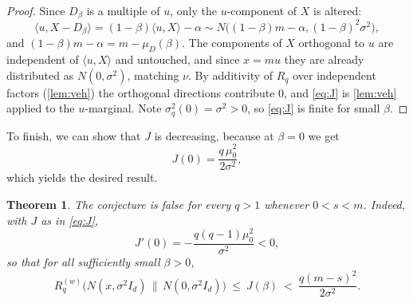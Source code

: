 \documentclass[10pt,a4paper]{amsart}
\newtheorem{theorem}{Theorem}
\numberwithin{equation}{section}
\begin{document}
\begin{proof}
Since $D_\beta$ is a multiple of $u$, only the $u$-component of $X$ is altered:
$$\langle u,X-D_\beta\rangle=(1-\beta)\langle u,X\rangle-\alpha\sim N\big((1-\beta)m-\alpha,(1-\beta)^2\sigma^2\big),$$
and $(1-\beta)m-\alpha=m-\mu_D(\beta)$. The components of $X$ orthogonal to $u$ are independent of $\langle u,X\rangle$ and untouched, and since $x=mu$ they are already distributed as $N(0,\sigma^2)$, matching $\nu$. By additivity of $R_q$ over independent factors (\cref{lem:veh}) the orthogonal directions contribute $0$, and \eqref{eq:J} is \cref{lem:veh} applied to the $u$-marginal. Note $\sigma_q^2(0)=\sigma^2>0$, so \eqref{eq:J} is finite for small $\beta$.
\end{proof}

To finish, we can show that $J$ is decreasing, because at $\beta=0$ we get
\begin{equation}\label{eq:J0}
J(0)=\frac{q\,\mu_0^2}{2\sigma^2},
\end{equation}
which yields the desired result.


\begin{theorem}\label{thm:qbig}
The conjecture is false for every $q>1$ whenever $0<s<m$. Indeed, with $J$ as in \eqref{eq:J},
$$J'(0)=-\frac{q(q-1)\mu_0^2}{\sigma^2}<0,$$
so that for all sufficiently small $\beta>0$,
$$R^{(w)}_{q}\big(N(x,\sigma^2I_d)\,\big\|\,N(0,\sigma^2I_d)\big)\ \le\ J(\beta)\ <\ \frac{q(m-s)^2}{2\sigma^2}.$$
\end{theorem}
\end{document}
